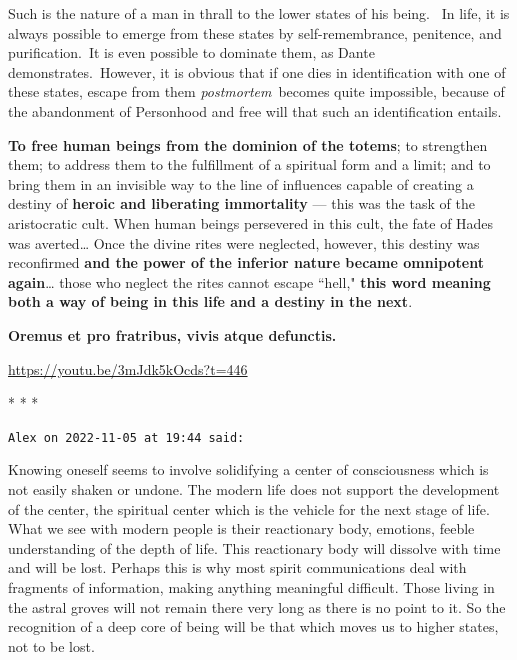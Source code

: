 Such is the nature of a man in thrall to the lower states of his being.  In life, it is always possible to emerge from these states by self-remembrance, penitence, and purification. It is even possible to dominate them, as Dante demonstrates. However, it is obvious that if one dies in identification with one of these states, escape from them \emph{postmortem} becomes quite impossible, because of the abandonment of Personhood and free will that such an identification entails.

\begin{quotex}
\textbf{To free human beings from the dominion of the totems}; to strengthen them; to address them to the fulfillment of a spiritual form and a limit; and to bring them in an invisible way to the line of influences capable of creating a destiny of \textbf{heroic and liberating immortality} — this was the task of the aristocratic cult. When human beings persevered in this cult, the fate of Hades was averted… Once the divine rites were neglected, however, this destiny was reconfirmed \textbf{and the power of the inferior nature became omnipotent again}… those who neglect the rites cannot escape ``hell," \textbf{this word meaning both a way of being in this life and a destiny in the next}. 

\end{quotex}
\textbf{Oremus et pro fratribus, vivis atque defunctis.}

\url{https://youtu.be/3mJdk5kOcds?t=446}




\begin{center}* * *\end{center}

\begin{footnotesize}\begin{sffamily}



\texttt{Alex on 2022-11-05 at 19:44 said: }

Knowing oneself seems to involve solidifying a center of consciousness which is not easily shaken or undone. The modern life does not support the development of the center, the spiritual center which is the vehicle for the next stage of life. What we see with modern people is their reactionary body, emotions, feeble understanding of the depth of life. This reactionary body will dissolve with time and will be lost. Perhaps this is why most spirit communications deal with fragments of information, making anything meaningful difficult. Those living in the astral groves will not remain there very long as there is no point to it. So the recognition of a deep core of being will be that which moves us to higher states, not to be lost.


\end{sffamily}\end{footnotesize}
